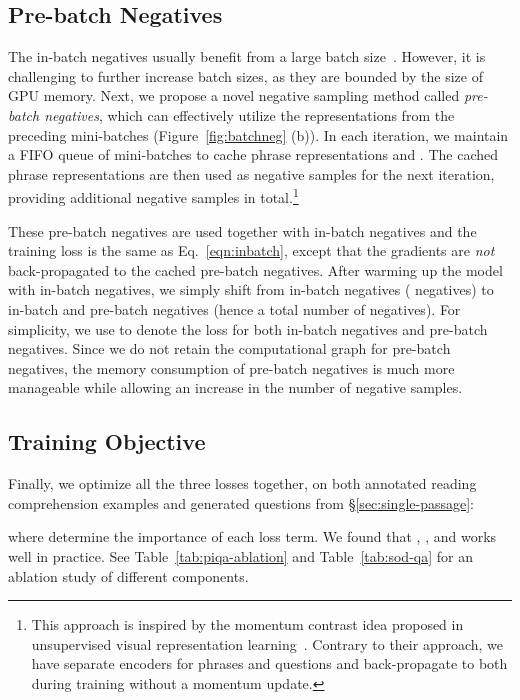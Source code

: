 \documentclass[11pt,a4paper]{article}
\newcommand\ti[1]{\textit{#1}}
\begin{document}
\subsection{Pre-batch Negatives}\label{sec:prebatch}
The in-batch negatives usually benefit from a large batch size~\citep{karpukhin2020dense}.
However, it is challenging to further increase batch sizes, as they are bounded by the size of GPU memory.
Next, we propose a novel negative sampling method called \ti{pre-batch negatives}, which can effectively utilize the representations from the preceding  mini-batches (Figure~\ref{fig:batchneg} (b)).
In each iteration, we maintain a FIFO queue of  mini-batches to cache phrase representations  and .  The cached phrase representations are then used as negative samples for the next iteration, providing  additional negative samples in total.\footnote{This approach is inspired by the momentum contrast idea proposed in unsupervised visual representation learning~\cite{he2020momentum}. Contrary to their approach, we have separate encoders for phrases and questions and back-propagate to both during training without a momentum update.}


These pre-batch negatives are used together with in-batch negatives and the training loss is the same as Eq.~\eqref{eqn:inbatch}, except that the gradients are \ti{not} back-propagated to the cached pre-batch negatives.
After warming up the model with in-batch negatives, we simply shift from in-batch negatives ( negatives) to in-batch and pre-batch negatives (hence a total number of  negatives).
For simplicity, we use  to denote the loss for both in-batch negatives and pre-batch negatives. Since we do not retain the computational graph for pre-batch negatives, the memory consumption of pre-batch negatives is much more manageable while allowing an increase in the number of negative samples.


\subsection{Training Objective} Finally, we optimize all the three losses together, on both annotated reading comprehension examples and generated questions from \S\ref{sec:single-passage}:

\noindent where  determine the importance of each loss term.
We found that , , and  works well in practice. See  Table~\ref{tab:piqa-ablation} and Table~\ref{tab:sod-qa} for an ablation study of different components.
\end{document}
